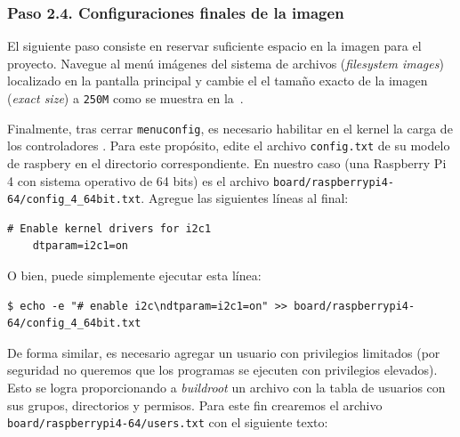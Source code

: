 \subsubsection*{Paso 2.4. Configuraciones finales de la imagen}

El siguiente paso consiste en reservar suficiente espacio en la imagen para el proyecto.
Navegue al menú imágenes del sistema de archivos (\emph{filesystem images}) localizado en la pantalla principal y cambie el el tamaño exacto de la imagen (\emph{exact size}) a \texttt{250M} como se muestra en la~.

Finalmente, tras cerrar \texttt{menuconfig}, es necesario habilitar en el kernel la carga de los controladores \IIC{}.
Para este propósito, edite el archivo \texttt{config.txt} de su modelo de raspbery en el directorio correspondiente.
En nuestro caso (una Raspberry Pi 4 con sistema operativo de 64 bits) es el archivo \texttt{board/raspberrypi4-64/config\_4\_64bit.txt}.
Agregue las siguientes líneas al final:

\begin{Verbatim}[gobble=1]
	# Enable kernel drivers for i2c1
	dtparam=i2c1=on
\end{Verbatim}

O bien, puede simplemente ejecutar esta línea:

\begin{Verbatim}[gobble=1]
	$ echo -e "# enable i2c\ndtparam=i2c1=on" >> board/raspberrypi4-64/config_4_64bit.txt
\end{Verbatim}

De forma similar, es necesario agregar un usuario con privilegios limitados (por seguridad no queremos que los programas se ejecuten con privilegios elevados).
Esto se logra proporcionando a \emph{buildroot} un archivo con la tabla de usuarios con sus grupos, directorios y permisos.
Para este fin crearemos el archivo \texttt{board/raspberrypi4-64/users.txt} con el siguiente texto:

\begin{minipage}{\columnwidth}

\end{minipage}
